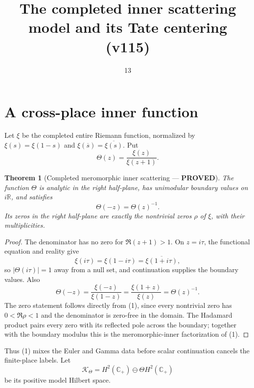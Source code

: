 \documentclass[11pt]{article}
\title{The completed inner scattering model and its Tate centering (v115)}
\date{13}
\newcommand{\PROVED}{\textcolor{green!40!black}{\textbf{PROVED}}}
\newtheorem{theorem}{Theorem}
\begin{document}
\maketitle

\section{A cross-place inner function}

Let $\xi$ be the completed entire Riemann function, normalized by
$\xi(s)=\xi(1-s)$ and $\xi(\overline s)=\overline{\xi(s)}$.  Put
\begin{equation}
                         \Theta(z)=\frac{\xi(z)}{\xi(z+1)}.    \tag{1}
\end{equation}

\begin{theorem}[Completed meromorphic inner scattering --- \PROVED]
The function $\Theta$ is analytic in the right half-plane, has unimodular
boundary values on $i\mathbb R$, and satisfies
\begin{equation}
                         \Theta(-z)=\Theta(z)^{-1}.             \tag{2}
\end{equation}
Its zeros in the right half-plane are exactly the nontrivial zeros $\rho$
of $\xi$, with their multiplicities.
\end{theorem}

\begin{proof}
The denominator has no zero for $\Re(z+1)>1$.  On $z=i\tau$, the functional
equation and reality give
\[
 \xi(i\tau)=\xi(1-i\tau)=\overline{\xi(1+i\tau)},
\]
so $|\Theta(i\tau)|=1$ away from a null set, and continuation supplies the
boundary values.  Also
\[
 \Theta(-z)=\frac{\xi(-z)}{\xi(1-z)}
            =\frac{\xi(1+z)}{\xi(z)}=\Theta(z)^{-1}.
\]
The zero statement follows directly from (1), since every nontrivial zero
has $0<\Re\rho<1$ and the denominator is zero-free in the domain.  The
Hadamard product pairs every zero with its reflected pole across the
boundary; together with the boundary modulus this is the meromorphic-inner
factorization of (1).
\end{proof}

Thus (1) mixes the Euler and Gamma data before scalar continuation cancels
the finite-place labels.  Let
\begin{equation}
 \mathscr K_\Theta=H^2(\mathbb C_+)\ominus\Theta H^2(\mathbb C_+)          \tag{3}
\end{equation}
be its positive model Hilbert space.
\end{document}
